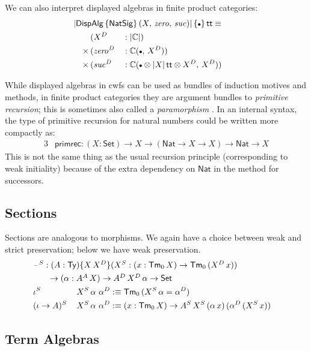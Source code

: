 \documentclass[12pt,a4paper,twoside,openany]{book}
\theoremstyle{remark}
\theoremstyle{definition}
\theoremstyle{theorem}
\newcommand{\mi}[1]{\mathit{#1}}
\newcommand{\ms}[1]{\mathsf{#1}}
\newcommand{\mbb}[1]{\mathbb{#1}}
\newcommand{\Tm}{\mathsf{Tm}}
\newcommand{\Ty}{\mathsf{Ty}}
\renewcommand{\tt}{\mathsf{tt}}
\newcommand{\blank}{\mathord{\hspace{1pt}\text{--}\hspace{1pt}}}
\newcommand{\Set}{\mathsf{Set}}
\newcommand{\emptycon}{\scaleobj{.75}\bullet}
\newcommand{\DispAlg}{\ms{DispAlg}}
\newcommand{\Nat}{\ms{Nat}}
\newcommand{\mbbC}{\mbb{C}}
\newcommand{\defn}{:\equiv}
\begin{document}
We can also interpret displayed algebras in finite product categories:
\begin{alignat*}{3}
  & \hspace{-2em}\rlap{$|\DispAlg\,\{\ms{NatSig}\}\,(X,\,\mi{zero},\,\mi{suc})|\,\{\emptycon\}\,\tt \equiv$}\\
              & (X^D &&: |\mbbC|)\\
      \times\,& (\mi{zero^D} &&: \mbbC(\emptycon,\,X^D))\\
      \times\,& (\mi{suc^D} &&: \mbbC(\emptycon \otimes |X|\,\tt \otimes X^D,\, X^D))
\end{alignat*}

While displayed algebras in cwfs can be used as bundles of induction motives and
methods, in finite product categories they are argument bundles to
\emph{primitive recursion}; this is sometimes also called a
\emph{paramorphism} \cite{bananas}. In an internal syntax, the type of primitive
recursion for natural numbers could be written more compactly as:
\begin{alignat*}{3}
  & \ms{primrec} : (X : \Set) \to X \to (\Nat \to X \to X) \to \Nat \to X
\end{alignat*}
This is not the same thing as the usual recursion principle (corresponding to
weak initiality) because of the extra dependency on $\Nat$ in the method for
successors.

\subsection{Sections}
Sections are analogous to morphisms. We again have a choice between weak and
strict preservation; below we have weak preservation.
\begin{alignat*}{3}
  & \rlap{$\blank^S : (A : \Ty)\{X\,X^D\}(X^S : (x : \Tm_0\,X)\to \Tm_0\,(X^D\,x))$}\\
  & \hspace{2em}\rlap{$\to (\alpha : A^A\,X) \to A^D\,X^D\,\alpha \to \Set$}\\
  & \iota^S\,&&X^S\,\alpha\,\,\alpha^D \defn \Tm_0\,(X^S\,\alpha = \alpha^D) \\
  & (\iota\to A)^S\,&&X^S\,\alpha\,\,\alpha^D \defn
  (x : \Tm_0\,X) \to A^S\,X^S\,(\alpha\,x)\,(\alpha^D\,(X^S\,x))
\end{alignat*}

\subsection{Term Algebras}
\label{sec:simple-2ltt-term-algebras}
\end{document}
